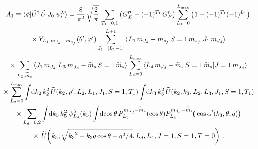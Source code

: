   \begin{multline}
   A_1 \equiv \la \phi | \widetilde{U}^\dag \, \widetilde{U}\, J_0 |
   \psi_i^\lambda \ra  = \frac{8}{\pi^2} \,\sqrt{\frac{2}{\pi}} \,
   \sum_{T_1 = 0,1} \big(G_E ^p + (-1)^{T_1} \,G_E^n\big)
   \sum_{L_1 = 0}^{L_{\rm max}} \big(1 + (-1)^{T_1} (-1)^{L_1}\big) \\
   \null \times
   Y_{L_1 , \mJd - \msf} (\thetacm, \phicm)
   \sum_{J_1 = |L_1 - 1|}^{L+1}
   \CG{L_1}{\mJd - \msf}{S=1}{\msf}{J_1}{\mJd} \\
   \null \times \sum_{L_3, \widetilde{m}_s}
   \braket{J_1 \, \mJd}{L_3 \, \mJd - \wt{m}_s \, S=1 \, \wt{m}_s}
   \sum_{L_4 = 0}^{L_{\rm max}}
   \CG{L_4}{\mJd - \widetilde{m}_s}{S=1}{\widetilde{m}_s}{J=1}{\mJd} \\
   \null \times
   \sum_{L_2 = 0}^{L_{\rm max}} \int \! \dd k_2 \, k_2^2 \,
    \widetilde{U} (k_2, \pp, L_2, L_1, J_1, S=1, T_1)
   \int \! \dd k_3 \, k_3^2 \,
    \widetilde{U} (k_2, k_3, L_2, L_3, J_1, S=1, T_1) \\
   \null \times
   \sum_{L_d = 0, 2} \int \! \dd k_5 \, k_5^2 \, \psi_{L_d}^\lambda (k_5)
   \int \! \dcostheta \, P_{L_3}^{\mJd - \widetilde{m}_s}(\cos \theta)
   P_{L_4}^{\mJd - \widetilde{m}_s}\!\big(\cos\thetacprime(k_3, \theta, q)\big)
   \\  \null \times
   \,\widetilde{U}\!\left(
    k_5, \sqrt{{k_3}^2 - k_3 q \cos\theta  + q^2/4}, L_d, L_4, J=1, S=1, T=0
   \right) \,.
  \end{multline}

